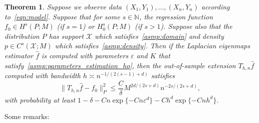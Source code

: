\documentclass{article}
\newcommand{\1}{\mathbf{1}}
\newcommand{\mc}[1]{\mathcal{#1}}
\newcommand{\wh}[1]{\widehat{#1}}
\theoremstyle{alden}
\theoremstyle{aldenthm}
\newtheorem{theorem}{Theorem}
\theoremstyle{definition}
\theoremstyle{remark}
\begin{document}
\begin{theorem}
	\label{thm:laplacian_eigenmaps_estimation_out_of_sample}
	Suppose we observe data $(X_1,Y_1),\ldots,(X_n,Y_n)$ according to~\eqref{eqn:model}. Suppose that for some $s \in \mathbb{N}$, the regression function $f_0 \in H^s(P;M)$ (if $s = 1$) or $H_0^s(P;M)$ (if $s > 1$). Suppose also that the distribution $P$ has support $\mc{X}$ which satisfies~\ref{asmp:domain} and density $p \in C^s(\mc{X};M)$ which satisfies~\ref{asmp:density}. Then if the Laplacian eigenmaps estimator $\wh{f}$ is computed with parameters $\varepsilon$ and $K$ that satisfy~\ref{asmp:parameters_estimation_ho}, then the out-of-sample extension $T_{h,n}\wh{f}$ computed with bandwidth $h \asymp n^{-1/(2(s - 1) + d)}$ satisfies
	\begin{equation*}
	\|T_{h,n}\wh{f} - f_0\|_P^2 \leq \frac{C}{\delta}M^{2d/(2s + d)}n^{-2s/(2s + d)},
	\end{equation*}
	with probability at least $1 - \delta - Cn\exp\{-Cn\varepsilon^d\} - Ch^d\exp\{-Cnh^d\}$. 
\end{theorem}
Some remarks:
\end{document}
